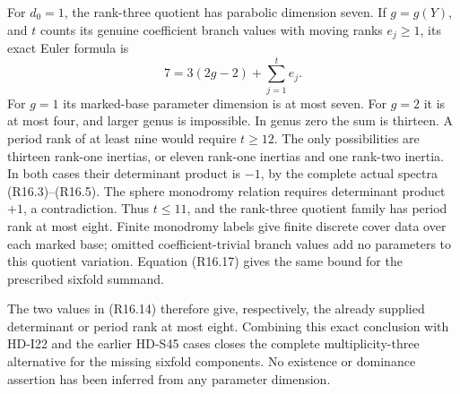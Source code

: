 For \(d_0=1\), the rank-three quotient has parabolic
dimension seven. If \(g=g(Y)\), and \(t\) counts its
genuine coefficient branch values with moving ranks
\(e_j\ge1\), its exact Euler formula is
\[
                    7=3(2g-2)+\sum_{j=1}^t e_j.         \tag{R16.18}
\]
For \(g=1\) its marked-base parameter dimension is at
most seven. For \(g=2\) it is at most four, and larger
genus is impossible. In genus zero the sum is thirteen.
A period rank of at least nine would require \(t\ge12\).
The only possibilities are thirteen rank-one inertias,
or eleven rank-one inertias and one rank-two inertia.
In both cases their determinant product is \(-1\),
by the complete actual spectra (R16.3)--(R16.5).
The sphere monodromy relation requires determinant product
\(+1\), a contradiction. Thus \(t\le11\), and the
rank-three quotient family has period rank at most eight.
Finite monodromy labels give finite discrete cover data
over each marked base; omitted coefficient-trivial branch
values add no parameters to this quotient variation.
Equation (R16.17) gives the same bound for the prescribed
sixfold summand.

The two values in (R16.14) therefore give, respectively,
the already supplied determinant or period rank at most
eight. Combining this exact conclusion with HD-I22 and
the earlier HD-S45 cases closes the complete
multiplicity-three alternative for the missing sixfold
components. No existence or dominance assertion has been
inferred from any parameter dimension.
